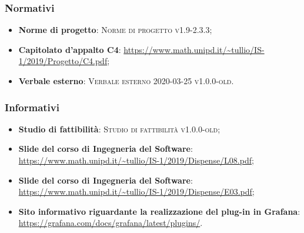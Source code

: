\documentclass[../analisi-dei-requisiti.tex]{subfiles}
\begin{document}
\subsubsection{Normativi}%
\label{sssec:normativi}

\begin{itemize}
  \item \textbf{Norme di progetto}: \textsc{Norme di progetto v1.9-2.3.3};
  \item \textbf{Capitolato d'appalto C4}: \url{https://www.math.unipd.it/~tullio/IS-1/2019/Progetto/C4.pdf};
  \item \textbf{Verbale esterno}: \textsc{Verbale esterno 2020-03-25 v1.0.0-old}.
\end{itemize}

\subsubsection{Informativi}%
\label{sssec:informativi}

\begin{itemize}
  \item \textbf{Studio di fattibilità}: \textsc{Studio di fattibilità v1.0.0-old};
  \item \textbf{Slide del corso di Ingegneria del Software}: \url{https://www.math.unipd.it/~tullio/IS-1/2019/Dispense/L08.pdf};
  \item \textbf{Slide del corso di Ingegneria del Software}: \url{https://www.math.unipd.it/~tullio/IS-1/2019/Dispense/E03.pdf};
  \item \textbf{Sito informativo riguardante la realizzazione del plug-in in Grafana}: \url{https://grafana.com/docs/grafana/latest/plugins/}.
\end{itemize}
\end{document}
